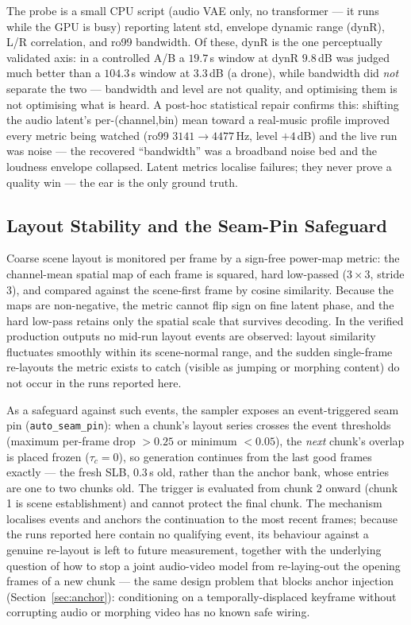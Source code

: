 \documentclass[12pt]{article}
\begin{document}
The probe is a small CPU script (audio VAE only, no transformer --- it runs
while the GPU is busy) reporting latent std, envelope dynamic range (dynR),
L/R correlation, and ro99 bandwidth.  Of these, dynR is the one
perceptually validated axis: in a controlled A/B a $19.7$\,s window at dynR
$9.8$\,dB was judged much better than a $104.3$\,s window at $3.3$\,dB (a
drone), while bandwidth did \emph{not} separate the two --- bandwidth and
level are not quality, and optimising them is not optimising what is heard.
A post-hoc statistical repair confirms this: shifting the audio latent's
per-(channel,bin) mean toward a real-music profile improved every metric
being watched (ro99 $3141\to4477$\,Hz, level $+4$\,dB) and the live run was
noise --- the recovered ``bandwidth'' was a broadband noise bed and the
loudness envelope collapsed.  Latent metrics localise failures; they never
prove a quality win --- the ear is the only ground truth.

\subsection{Layout Stability and the Seam-Pin Safeguard}
\label{sec:events}

Coarse scene layout is monitored per frame by a sign-free power-map metric:
the channel-mean spatial map of each frame is squared, hard low-passed
($3\times3$, stride 3), and compared against the scene-first frame by cosine
similarity.  Because the maps are non-negative, the metric cannot flip sign
on fine latent phase, and the hard low-pass retains only the spatial scale
that survives decoding.  In the verified production outputs no mid-run
layout events are observed: layout similarity fluctuates smoothly within its
scene-normal range, and the sudden single-frame re-layouts the metric
exists to catch (visible as jumping or morphing content) do not occur in the
runs reported here.

As a safeguard against such events, the sampler exposes an event-triggered
seam pin (\texttt{auto\_seam\_pin}): when a chunk's layout series crosses
the event thresholds (maximum per-frame drop $>0.25$ or minimum $<0.05$),
the \emph{next} chunk's overlap is placed frozen ($\tau_c=0$), so
generation continues from the last good frames exactly --- the fresh SLB,
$0.3$\,s old, rather than the anchor bank, whose entries are one to two
chunks old.  The trigger is evaluated from chunk 2 onward (chunk 1 is scene
establishment) and cannot protect the final chunk.  The mechanism localises
events and anchors the continuation to the most recent frames; because the
runs reported here contain no qualifying event, its behaviour against a
genuine re-layout is left to future measurement, together with the
underlying question of how to stop a joint audio-video model from
re-laying-out the opening frames of a new chunk --- the same design problem
that blocks anchor injection (Section~\ref{sec:anchor}): conditioning on a
temporally-displaced keyframe without corrupting audio or morphing video
has no known safe wiring.
\end{document}
